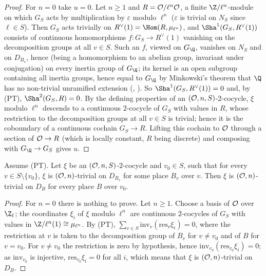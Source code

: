 \begin{proof}
For $n=0$ take $u=0$. Let $n\ge1$ and $R=\mathcal{O}/\ell^n\mathcal{O}$, a finite $\Z/\ell^n$-module on which $G_S$ acts by multiplication
by $\varepsilon$ modulo $\ell^n$ ($\varepsilon$ is trivial on $N_S$ since $\ell\in S$). Then $G_S$ acts trivially on
$R^\vee(1)=\Hom(R,\mu_{\ell^n})$, and $\Sha^1(G_S,R^\vee(1))$ consists of continuous homomorphisms $f\colon G_S\to R^\vee(1)$
vanishing on the decomposition groups at all $v\in S$. Such an $f$, viewed on $G_\Q$, vanishes on $N_S$ and on $D_{B_v}$, hence (being a
homomorphism to an abelian group, invariant under conjugation) on every inertia group of $G_\Q$; its kernel is an open
subgroup containing all inertia groups, hence equal to $G_\Q$ by Minkowski's theorem that $\Q$ has no non-trivial unramified
extension (, \cite[III.2.18]{Neukirch1999}). So $\Sha^1(G_S,R^\vee(1))=0$ and, by
(PT), $\Sha^2(G_S,R)=0$. By the defining properties of an $(\mathcal{O},n,S)$-$2$-cocycle, $\xi$ modulo $\ell^n$ descends to a
continuous $2$-cocycle of $G_S$ with values in $R$, whose restriction to the decomposition groups at all $v\in S$ is trivial;
hence it is the coboundary of a continuous cochain $G_S\to R$. Lifting this cochain to $\mathcal{O}$ through a section of
$\mathcal{O}\to R$ (which is locally constant, $R$ being discrete) and composing with $G_\Q\to G_S$ gives $u$.
\end{proof}

\begin{lemma}[Reciprocity]\label{pf:kato:rec}
Assume (PT). Let $\xi$ be an $(\mathcal{O},n,S)$-$2$-cocycle and $v_0\in S$, such that for every $v\in S\setminus\{v_0\}$, $\xi$ is
$(\mathcal{O},n)$-trivial on $D_{B_v}$ for some place $B_v$ over $v$. Then $\xi$ is $(\mathcal{O},n)$-trivial on $D_B$ for every place $B$
over $v_0$.
\end{lemma}

\begin{proof}
For $n=0$ there is nothing to prove. Let $n\ge1$. Choose a basis of $\mathcal{O}$ over $\Z_\ell$; the coordinates $\xi_i$ of $\xi$
modulo $\ell^n$ are continuous $2$-cocycles of $G_S$ with values in $\Z/\ell^n(1)\cong\mu_{\ell^n}$. By (PT),
$\sum_{v\in S}\mathrm{inv}_v(\mathrm{res}_v\xi_i)=0$, where the restriction at $v$ is taken to the decomposition group of $B_v$
for $v\ne v_0$ and of $B$ for $v=v_0$. For $v\ne v_0$ the restriction is zero by hypothesis, hence
$\mathrm{inv}_{v_0}(\mathrm{res}_{v_0}\xi_i)=0$; as $\mathrm{inv}_{v_0}$ is injective, $\mathrm{res}_{v_0}\xi_i=0$ for all $i$, which
means that $\xi$ is $(\mathcal{O},n)$-trivial on $D_B$.
\end{proof}

